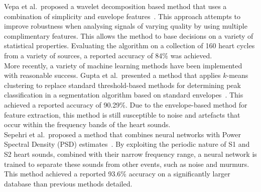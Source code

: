 \documentclass[titlepage, 12pt]{scrartcl} \usepackage{enumitem}
\begin{document}
Vepa et al.\ proposed a wavelet decomposition based method that uses a
combination of simplicity and envelope features~\parencite{Vepa2008}. This
approach attempts to improve robustness when analysing signals of varying
quality by using multiple complimentary features. This allows the method to base
decisions on a variety of statistical properties. Evaluating the algorithm on a
collection of 160 heart cycles from a variety of sources, a reported accuracy
of 84\% was achieved.\\

More recently, a variety of machine learning methods have been implemented with
reasonable success. Gupta et al.\ presented a method that applies $k$-means
clustering to replace standard threshold-based methods for determining peak
classification in a segmentation algorithm based on standard
envelopes~\parencite{Gupta2007}. This achieved a reported accuracy of 90.29\%.
Due to the envelope-based method for feature extraction, this method is still
susceptible to noise and artefacts that occur within the frequency bands of the
heart sounds.\\

Sepehri et al.\ proposed a method that combines neural networks with Power
Spectral Density (PSD) estimates~\parencite{Sepehri2010}.  By exploiting the
periodic nature of S1 and S2 heart sounds, combined with their narrow frequency
range, a neural network is trained to separate these sounds from other events,
such as noise and murmurs. This method achieved a reported 93.6\% accuracy on a
significantly larger database than previous methods detailed.\\
\end{document}
